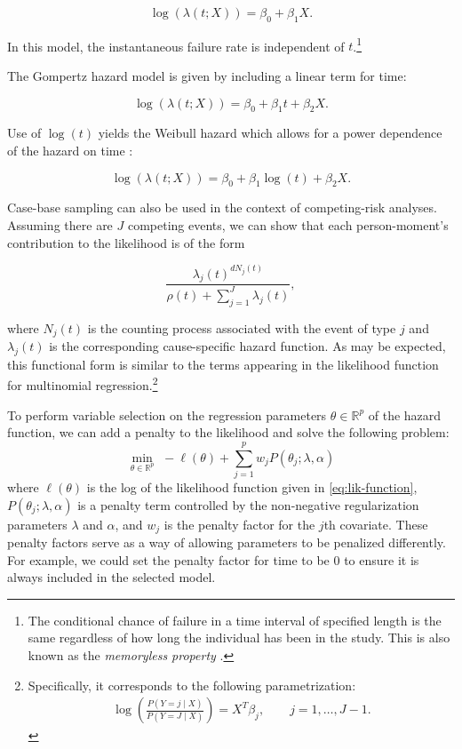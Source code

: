 \documentclass[
]{jss}
\begin{document}
\begin{equation}
\log(\lambda(t; X)) = \beta_0 + \beta_1 X. \label{eq:exp}
\end{equation}

In this model, the instantaneous failure rate is independent of
\(t\).\footnote{The conditional chance of failure in a time interval of specified length is the same regardless of how long the individual has been in the study. This is also known as the \textit{memoryless property} \citep{kalbfleisch2011statistical}.}

The Gompertz hazard model is given by including a linear term for time:

\begin{equation}
\log(\lambda(t; X)) = \beta_0 + \beta_1 t + \beta_2 X. \label{eq:gomp}
\end{equation}

Use of \(\log(t)\) yields the Weibull hazard which allows for a power
dependence of the hazard on time \citep{kalbfleisch2011statistical}:

\begin{equation}
\log(\lambda(t; X)) = \beta_0 + \beta_1 \log(t) + \beta_2 X. \label{eq:weibull}
\end{equation}

Case-base sampling can also be used in the context of competing-risk
analyses. Assuming there are \(J\) competing events, we can show that
each person-moment's contribution to the likelihood is of the form

\[\frac{\lambda_j(t)^{dN_j(t)}}{\rho(t) + \sum_{j=1}^J\lambda_j(t)},\]

where \(N_j(t)\) is the counting process associated with the event of
type \(j\) and \(\lambda_j(t)\) is the corresponding cause-specific
hazard function. As may be expected, this functional form is similar to
the terms appearing in the likelihood function for multinomial
regression.\footnote{Specifically, it corresponds to the following parametrization: \begin{align*} \log\left(\frac{P(Y=j \mid X)}{P(Y = J \mid X)}\right) = X^T\beta_j, \qquad j = 1,\ldots, J-1.\end{align*}}

To perform variable selection on the regression parameters
\(\theta \in \mathbb{R}^p\) of the hazard function, we can add a penalty
to the likelihood and solve the following problem: \begin{equation}
\min _{\theta \in \mathbb{R}^{p}}\,\,-\ell\left(\theta\right)+\sum_{j=1}^p w_j P(\theta_j;\lambda,\alpha) \label{eq:penest}
\end{equation} where \(\ell\left(\theta\right)\) is the log of the
likelihood function given in \eqref{eq:lik-function},
\(P(\theta_j;\lambda,\alpha)\) is a penalty term controlled by the
non-negative regularization parameters \(\lambda\) and \(\alpha\), and
\(w_j\) is the penalty factor for the \(j\)th covariate. These penalty
factors serve as a way of allowing parameters to be penalized
differently. For example, we could set the penalty factor for time to be
0 to ensure it is always included in the selected model.
\end{document}
